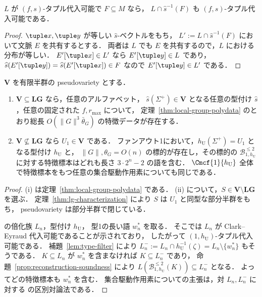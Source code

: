 \begin{lemma}[型フィルタは代入可能性を保つ]
\label{lem:type-filter}
$L$ が $(f,s)$-タプル代入可能で $F\subseteq M$ なら，
$L\cap \widehat{s}^{-1}(F)$ も $(f,s)$-タプル代入可能である．
\end{lemma}

\begin{proof}
$\tuple x,\tuple y$ が等しい $\widehat{s}$-ベクトルをもち，
$L':=L\cap \widehat{s}^{-1}(F)$ において文脈 $E$ を共有するとする．
両者は $L$ でも $E$ を共有するので，$L$ における分布が等しい．
$E'[\tuple x]\in L'$ なら $E'[\tuple y]\in L$ であり，
$\widehat{s}(E'[\tuple y])=\widehat{s}(E'[\tuple x])\in F$ なので $E'[\tuple y]\in L'$ である．
\end{proof}

\begin{corollary}
\label{cor:pseudovariety-dichotomy}
$\mathbf V$ を有限半群の pseudovariety とする．
\begin{enumerate}[label=\textup{(\roman*)},leftmargin=*]
\item $\mathbf V\subseteq\mathbf{LG}$ なら，任意のアルファベット，
$\widehat{s}(\Sigma^+)\in\mathbf V$ となる任意の型付け $\widehat{s}$，任意の固定された $f,r_{\max}$ について，
定理~\ref{thm:local-group-polydata} のとおり総長 $O(\|G\|^3\bar\theta_G)$ の特徴データが存在する．
\item $\mathbf V\not\subseteq\mathbf{LG}$ なら $U_1\in\mathbf V$ である．
ファンアウト1において，$h_{\mathrm U}(\Sigma^+)=U_1$ となる型付け $h_{\mathrm U}$ と，
$\|G\|,\theta_G=O(n)$ の標的が存在し，その標的の
$\mathcal B^{\le2}_{1,h_{\mathrm U}}$ に対する特徴標本はどれも長さ $3\cdot2^n-2$ の語を含む．
$\Cmcf{1}{h_{\mathrm U}}$ 全体で特徴標本をもつ任意の集合駆動作用素についても同じである．
\end{enumerate}
\end{corollary}

\begin{proof}
(i) は定理~\ref{thm:local-group-polydata} である．
(ii) について，$S\in\mathbf V\setminus\mathbf{LG}$ を選ぶ．
定理~\ref{thm:lg-characterization} により $S$ は $U_1$ と同型な部分半群をもち，
pseudovariety は部分半群で閉じている．

\cite[Proposition~6.4]{kuriyamaCFG} の倍化族 $L_n$，型付け $h_{\mathrm U}$，
型1の長い語 $w_n^*$ を取る．
そこでは $L_n$ が Clark--Eyraud 代入可能であることが示されており，
したがって $(1,h_{\mathrm U})$-タプル代入可能である．
補題~\ref{lem:type-filter} により
$L_n^-:=L_n\cap h_{\mathrm U}^{-1}(\zeta)=L_n\setminus\{w_n^*\}$ もそうである．
$K\subseteq L_n$ が $w_n^*$ を含まなければ $K\subseteq L_n^-$ であり，
命題~\ref{prop:reconstruction-soundness} により
$L(\mathcal B^{\le2}_{1,h_{\mathrm U}}(K))\subseteq L_n^-$ となる．
よってどの特徴標本も $w_n^*$ を含む．
集合駆動作用素についての主張は，対 $L_n,L_n^-$ に対する
\cite[Proposition~6.4(iv)]{kuriyamaCFG} の区別対論法である．
\end{proof}


